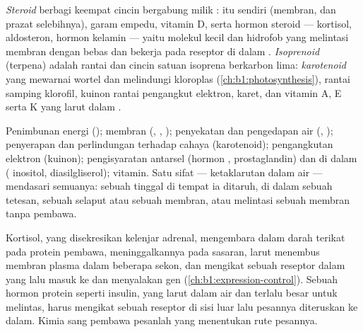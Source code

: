 \begin{definition}\label{def:b1:lipids:steroids}
\emph{Steroid} berbagi keempat cincin bergabung milik
:  itu sendiri (membran, dan prazat selebihnya),
garam empedu, vitamin D, serta hormon steroid --- kortisol,
aldosteron, hormon kelamin --- yaitu molekul kecil dan hidrofob yang
melintasi membran dengan bebas dan bekerja pada reseptor di dalam .
\emph{Isoprenoid} (terpena) adalah rantai dan cincin
satuan isoprena berkarbon lima: \emph{karotenoid} yang mewarnai wortel
dan melindungi kloroplas (\cref{ch:b1:photosynthesis}), rantai samping
klorofil, kuinon rantai pengangkut elektron, karet, dan vitamin A, E
serta K yang larut dalam .
\end{definition}

\begin{proposition}\label{prop:b1:lipids:functions}
Penimbunan energi (); membran (, ,
); penyekatan dan pengedapan air (, ); penyerapan dan
perlindungan terhadap cahaya (karotenoid); pengangkutan elektron
(kuinon); pengisyaratan antarsel (hormon , prostaglandin) dan di
dalam  ( inositol, diasilgliserol); vitamin. Satu sifat ---
ketaklarutan dalam air --- mendasari semuanya: sebuah  tinggal di
tempat ia ditaruh, di dalam sebuah tetesan, sebuah selaput atau sebuah
membran, atau melintasi sebuah membran tanpa pembawa.
\end{proposition}

\begin{example}\label{ex:b1:lipids:steroidhormone}
Kortisol, yang disekresikan kelenjar adrenal, mengembara dalam darah
terikat pada protein pembawa, meninggalkannya pada  sasaran, larut
menembus membran plasma dalam beberapa sekon, dan mengikat sebuah
reseptor dalam  yang lalu masuk ke  dan menyalakan gen
(\cref{ch:b1:expression-control}). Sebuah hormon protein seperti
insulin, yang larut dalam air dan terlalu besar untuk melintas, harus
mengikat sebuah reseptor di sisi luar lalu pesannya diteruskan ke dalam.
Kimia sang pembawa pesanlah yang menentukan rute pesannya.
\end{example}

